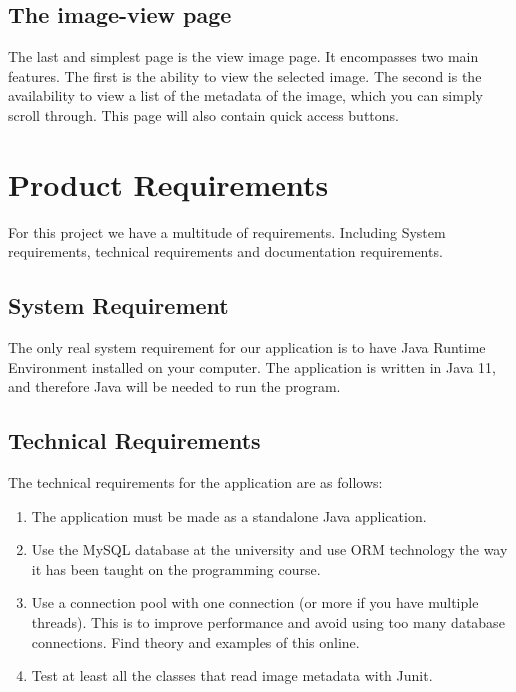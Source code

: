 \documentclass{article}
\begin{document}
\subsection{The image-view page}
The last and simplest page is the view image page. It encompasses two main features. The first is the ability to view the selected image. The second is the availability to view a list of the metadata of the image, which you can simply scroll through. This page will also contain quick access buttons.

\section{Product Requirements}
For this project we have a multitude of requirements. Including System requirements, technical requirements and documentation requirements. 
\subsection{System Requirement}
The only real system requirement for our application is to have Java Runtime Environment installed on your computer. The application is written in Java 11, and therefore Java will be needed to run the program.

\subsection{Technical Requirements}
The technical requirements for the application are as follows:
\begin{enumerate}
    \item The application must be made as a standalone Java application.
    \item Use the MySQL database at the university and use ORM technology the way it has been taught on the programming course.
    \item Use a connection  pool  with  one  connection  (or  more  if  you  have  multiple  threads). This is to improve performance and avoid using too many database connections. Find theory and examples of this online.
    \item Test at least all the classes that read image metadata with Junit.
\end{enumerate}
\end{document}
